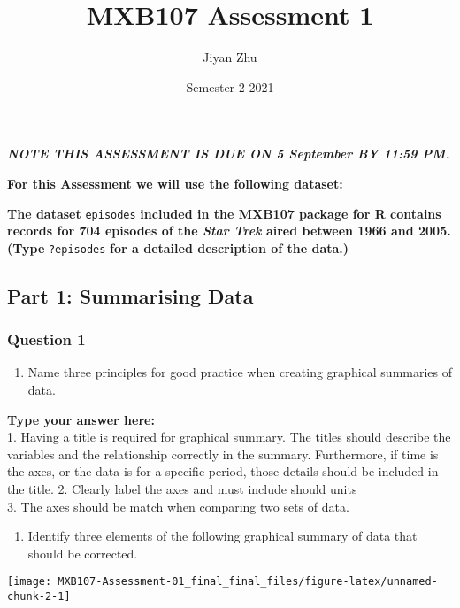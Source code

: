 \documentclass[
]{article}
\title{MXB107 Assessment 1}
\author{Jiyan Zhu}
\date{Semester 2 2021}
\providecommand{\tightlist}{%
  \setlength{\itemsep}{0pt}\setlength{\parskip}{0pt}}
\begin{document}
\maketitle

\textbf{\emph{NOTE THIS ASSESSMENT IS DUE ON 5 September BY 11:59 PM.}}

\textbf{For this Assessment we will use the following dataset:}

\textbf{The dataset} \texttt{episodes} \textbf{included in the MXB107
package for R contains records for 704 episodes of the \emph{Star Trek}
aired between 1966 and 2005. (Type} \texttt{?episodes} \textbf{for a
detailed description of the data.)}

\hypertarget{part-1-summarising-data}{%
\subsection{Part 1: Summarising Data}\label{part-1-summarising-data}}

\hypertarget{question-1}{%
\subsubsection{Question 1}\label{question-1}}

\begin{enumerate}
\def\labelenumi{\alph{enumi}.}
\tightlist
\item
  Name three principles for good practice when creating graphical
  summaries of data.
\end{enumerate}

\textbf{Type your answer here:}\\
1. Having a title is required for graphical summary. The titles should
describe the variables and the relationship correctly in the summary.
Furthermore, if time is the axes, or the data is for a specific period,
those details should be included in the title. 2. Clearly label the axes
and must include should units\\
3. The axes should be match when comparing two sets of data.

\begin{enumerate}
\def\labelenumi{\alph{enumi}.}
\setcounter{enumi}{1}
\tightlist
\item
  Identify three elements of the following graphical summary of data
  that should be corrected.
\end{enumerate}

\begin{center}\texttt{[image: MXB107-Assessment-01\_final\_final\_files/figure-latex/unnamed-chunk-2-1]} \end{center}
\end{document}
